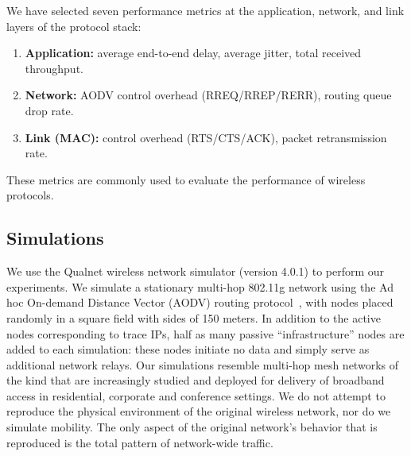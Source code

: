 \documentclass[conference]{IEEEtran}
\newcommand{\caps}[1]{{\small{#1}}}
\begin{document}
We have selected seven performance metrics at the application, network, and link layers of the protocol stack:
\begin{enumerate}
\setlength{\itemsep}{0em}
\item \textbf{Application:} average end-to-end delay, average jitter, total received throughput.
\item \textbf{Network:} \caps{AODV} control overhead (\caps{RREQ/RREP/RERR}), routing queue drop rate.
\item \textbf{Link (\caps{MAC}):} control overhead (\caps{RTS/CTS/ACK}), packet retransmission rate.
\end{enumerate}
These metrics are commonly used to evaluate the performance of wireless protocols.%

\subsection{Simulations}\label{sec:simulations}

We use the Qualnet wireless network simulator (version 4.0.1) to perform our experiments. We simulate a stationary multi-hop 802.11g network using the Ad hoc On-demand Distance Vector (\caps{AODV}) routing protocol~\cite{rfc:aodv}, with nodes placed randomly in a square field with sides of 150 meters.
In addition to the active nodes corresponding to trace \caps{IP}s, half as many passive ``infrastructure'' nodes are added to each simulation: these nodes initiate no data and simply serve as additional network relays. Our simulations resemble multi-hop mesh networks of the kind that are increasingly studied and deployed for delivery of broadband access in residential, corporate and conference settings. We do not attempt to reproduce the physical environment of the original wireless network, nor do we simulate mobility. The only aspect of the original network's behavior that is reproduced is the total pattern of network-wide traffic.
\end{document}
